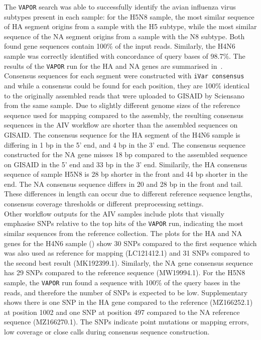 The \texttt{VAPOR} search was able to successfully identify the avian influenza virus subtypes present in each sample: for the H5N8 sample, the most similar sequence of HA segment origins from a sample with the H5 subtype, while the most similar sequence of the NA segment origins from a sample with the N8 subtype. Both found gene sequences contain 100\% of the input reads. Similarly, the H4N6 sample was correctly identified with concordance of query bases of 98.7\%. The results of the \texttt{VAPOR} run for the HA and NA genes are summarised in~. \\
Consensus sequences for each segment were constructed with \texttt{iVar consensus} and while a consensus could be found for each position, they are 100\% identical to the originally assembled reads that were uploaded to \ac{GISAID} by Sciensano from the same sample. Due to slightly different genome sizes of the reference sequence used for mapping compared to the assembly, the resulting consensus sequences in the \ac{AIV} workflow are shorter than the assembled sequences on \ac{GISAID}. The consensus sequence for the \ac{HA} segment of the H4N6 sample is differing in 1 bp in the 5' end, and 4 bp in the 3' end. The consensus sequence constructed for the \ac{NA} gene misses 18 bp compared to the assembled sequence on \ac{GISAID} in the 5' end and 33 bp in the 3' end. Similarily, the \ac{HA} consensus sequence of sample H5N8 is 28 bp shorter in the front and 44 bp shorter in the end. The \ac{NA} consensus sequence differs in 20 and 28 bp in the front and tail. These differences in length can occur due to different reference sequence lengths, consensus coverage thresholds or different preprocessing settings. \\
Other workflow outputs for the \ac{AIV} samples include plots that visually emphasise \acp{SNP} relative to the top hits of the \texttt{VAPOR} run, indicating the most similar sequences from the reference collection. The plots for the \ac{HA} and \ac{NA} genes for the H4N6 sample () show 30 \acp{SNP} compared to the first sequence which was also used as reference for mapping (LC121412.1) and 31 \acp{SNP} compared to the second best result (MK192399.1). Similarly, the \ac{NA} gene consensus sequence has 29 \acp{SNP} compared to the reference sequence (MW19994.1). For the H5N8 sample, the \texttt{VAPOR} run found a sequence with 100\% of the query bases in the reads, and therefore the number of \acp{SNP} is expected to be low. Supplementary~ shows there is one \ac{SNP} in the \ac{HA} gene compared to the reference (MZ166252.1) at position 1002 and one \ac{SNP} at position 497 compared to the \ac{NA} reference sequence (MZ166270.1). The \acp{SNP} indicate point mutations or mapping errors, low coverage or close calls during consensus sequence construction. \\
